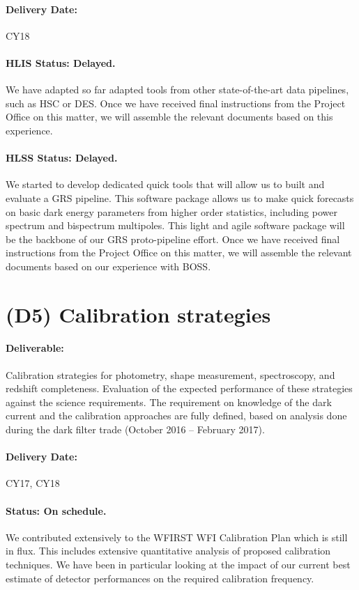 \paragraph*{Delivery Date:} CY18

\paragraph*{HLIS Status: Delayed.} We have adapted so far adapted tools from other state-of-the-art data pipelines, such as HSC or DES. Once we have received final instructions from the Project Office on this matter, we will assemble the relevant documents based on this experience.

\paragraph*{HLSS Status: Delayed.} We started to develop dedicated quick tools that
will allow us to built and evaluate a GRS pipeline. This software package allows us to make quick forecasts on basic dark energy parameters from higher order statistics, including power spectrum and bispectrum multipoles. This light and agile software package will be the backbone of our GRS proto-pipeline effort. Once we have received final instructions from the Project Office on this matter, we will assemble the relevant documents based on our experience with BOSS.

\section*{(D5) Calibration strategies}

\paragraph*{Deliverable:} Calibration strategies for photometry, shape
measurement, spectroscopy, and redshift completeness. Evaluation of the expected
performance of these strategies against the science requirements. The
requirement on knowledge of the dark current and the calibration approaches are
fully defined, based on analysis done during the dark filter trade (October 2016
-- February 2017).

\paragraph*{Delivery Date:} CY17, CY18

\paragraph*{Status: On schedule.} We contributed extensively to the WFIRST WFI Calibration Plan which is still in flux. This includes extensive quantitative analysis of proposed calibration techniques. We have been in particular looking at the impact of our current best estimate of detector performances on the required calibration frequency.



